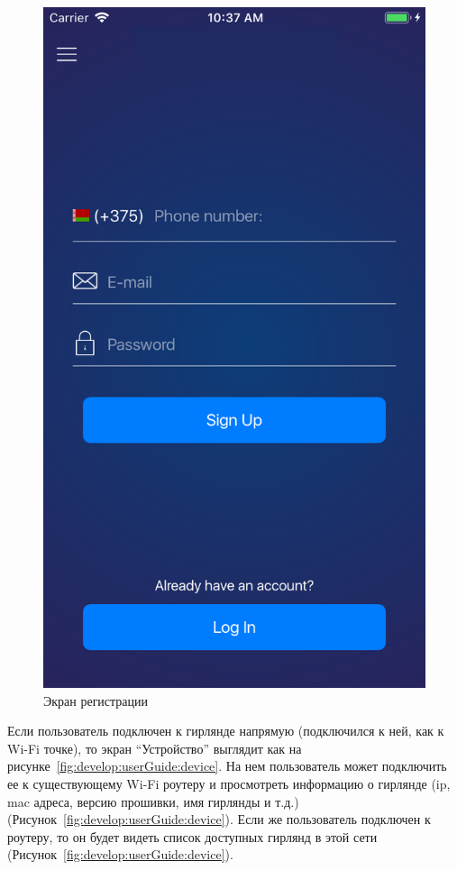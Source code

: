 \begin{figure}[H]
\centering
	\includegraphics[scale=0.2]{figures/userGuide/signUp.png}
	\caption{Экран регистрации}
	\label{fig:develop:userGuide:signUp}
\end{figure}

Если пользователь подключен к гирлянде напрямую (подключился к ней, как к Wi-Fi точке), то экран ``Устройство'' выглядит как на рисунке~\ref{fig:develop:userGuide:device}. На нем пользователь может подключить ее к существующему Wi-Fi роутеру и просмотреть информацию о гирлянде (ip, mac адреса, версию прошивки, имя гирлянды и т.д.) (Рисунок~\ref{fig:develop:userGuide:device}). Если же пользователь подключен к роутеру, то он будет видеть список доступных гирлянд в этой сети (Рисунок~\ref{fig:develop:userGuide:device}).


